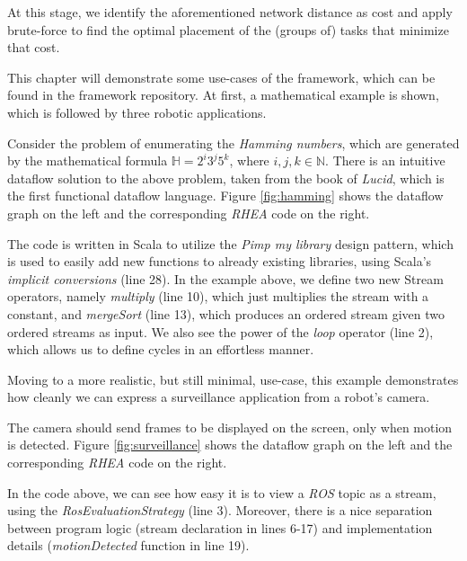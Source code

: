 \documentclass{dithesis}
\begin{document}
At this stage, we identify the aforementioned network distance as cost and apply brute-force to find the optimal placement of the (groups of) tasks that minimize that cost.

This chapter will demonstrate some use-cases of the framework, which can be found in the framework repository\cite{rhea}. At first, a mathematical example is shown, which is followed by three robotic applications. 

Consider the problem of enumerating the \textit{Hamming numbers}, which are generated by the mathematical formula $\mathbb{H} = 2^i3^j5^k$, where $i,j,k \in \mathbb{N}$. There is an intuitive dataflow solution to the above problem, taken from the book of \textit{Lucid}, which is the first functional dataflow language\cite{lucid}. Figure \ref{fig:hamming} shows the dataflow graph on the left and the corresponding \textit{RHEA} code on the right.


The code is written in Scala to utilize the \textit{Pimp my library} design pattern\cite{pimp}, which is used to easily add new functions to already existing libraries, using Scala's \textit{implicit conversions} (line 28). In the example above, we define two new Stream operators, namely \textit{multiply} (line 10), which just multiplies the stream with a constant, and \textit{mergeSort} (line 13), which produces an ordered stream given two ordered streams as input. We also see the power of the \textit{loop} operator (line 2), which allows us to define cycles in an effortless manner.


Moving to a more realistic, but still minimal, use-case, this example demonstrates how cleanly we can express a surveillance application from a robot's camera.

The camera should send frames to be displayed on the screen, only when motion is detected. Figure \ref{fig:surveillance} shows the dataflow graph on the left and the corresponding \textit{RHEA} code on the right.


In the code above, we can see how easy it is to view a \textit{ROS} topic as a stream, using the \textit{RosEvaluationStrategy} (line 3). Moreover, there is a nice separation between program logic (stream declaration in lines 6-17) and implementation details (\textit{motionDetected} function in line 19).
\end{document}
